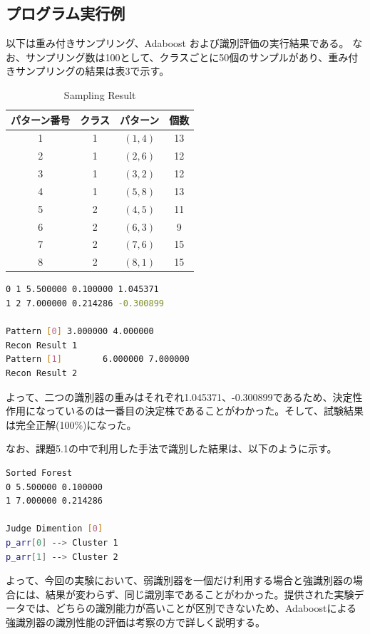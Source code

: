 \documentclass[ %
  uplatex,%
  papersize%
]{jsarticle}
\begin{document}
\subsection{プログラム実行例}
以下は重み付きサンプリング、Adaboost および識別評価の実行結果である。
なお、サンプリング数は100として、クラスごとに50個のサンプルがあり、重み付きサンプリングの結果は表3で示す。
\newpage

\begin{table}[h]\footnotesize
\caption{Sampling Result}
\label{}
\centering
\begin{tabular}{|c|c|c|c|}
\hline
パターン番号&クラス&パターン&個数\\
\hline
1 & 1 &$(1, 4)$ &13\\
\hline
2 & 1 &$(2, 6)$ &12\\
\hline
3 & 1 &$(3, 2)$ &12\\
\hline
4 & 1 &$(5, 8)$ &13\\
\hline
5 & 2 &$(4, 5)$ &11\\
\hline
6 & 2 &$(6, 3)$ &9\\
\hline
7 & 2 &$(7, 6)$ &15\\
\hline
8 & 2 &$(8, 1)$ &15\\
\hline
\end{tabular} 
\end{table}

\begin{lstlisting}[language=bash,caption=Adaboost and Recognition]
0 1 5.500000 0.100000 1.045371
1 2 7.000000 0.214286 -0.300899

Pattern [0]	3.000000 4.000000
Recon Result 1
Pattern [1]	       6.000000 7.000000
Recon Result 2
\end{lstlisting}

よって、二つの識別器の重みはそれぞれ1.045371、-0.300899であるため、決定性作用になっているのは一番目の決定株であることがわかった。そして、試験結果は完全正解(100\%)になった。

なお、課題5.1の中で利用した手法で識別した結果は、以下のように示す。

\begin{lstlisting}[language=bash,caption=Decetion Stump Result]
Sorted Forest
0 5.500000 0.100000
1 7.000000 0.214286

Judge Dimention [0]
p_arr[0] --> Cluster 1 
p_arr[1] --> Cluster 2 
\end{lstlisting}

よって、今回の実験において、弱識別器を一個だけ利用する場合と強識別器の場合には、結果が変わらず、同じ識別率であることがわかった。提供された実験データでは、どちらの識別能力が高いことが区別できないため、Adaboostによる強識別器の識別性能の評価は考察の方で詳しく説明する。
\end{document}
